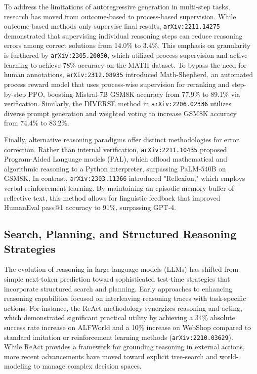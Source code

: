 \documentclass[11pt]{article}
\begin{document}
To address the limitations of autoregressive generation in multi-step tasks, research has moved from outcome-based to process-based supervision. While outcome-based methods only supervise final results, \texttt{arXiv:2211.14275} demonstrated that supervising individual reasoning steps can reduce reasoning errors among correct solutions from 14.0\% to 3.4\%. This emphasis on granularity is furthered by \texttt{arXiv:2305.20050}, which utilized process supervision and active learning to achieve 78\% accuracy on the MATH dataset. To bypass the need for human annotations, \texttt{arXiv:2312.08935} introduced Math-Shepherd, an automated process reward model that uses process-wise supervision for reranking and step-by-step PPO, boosting Mistral-7B GSM8K accuracy from 77.9\% to 89.1\% via verification. Similarly, the DIVERSE method in \texttt{arXiv:2206.02336} utilizes diverse prompt generation and weighted voting to increase GSM8K accuracy from 74.4\% to 83.2\%.

Finally, alternative reasoning paradigms offer distinct methodologies for error correction. Rather than internal verification, \texttt{arXiv:2211.10435} proposed Program-Aided Language models (PAL), which offload mathematical and algorithmic reasoning to a Python interpreter, surpassing PaLM-540B on GSM8K. In contrast, \texttt{arXiv:2303.11366} introduced "Reflexion," which employs verbal reinforcement learning. By maintaining an episodic memory buffer of reflective text, this method allows for linguistic feedback that improved HumanEval pass@1 accuracy to 91\%, surpassing GPT-4.

\subsection{Search, Planning, and Structured Reasoning Strategies}

The evolution of reasoning in large language models (LLMs) has shifted from simple next-token prediction toward sophisticated test-time strategies that incorporate structured search and planning. Early approaches to enhancing reasoning capabilities focused on interleaving reasoning traces with task-specific actions. For instance, the ReAct methodology synergizes reasoning and acting, which demonstrated significant practical utility by achieving a 34\% absolute success rate increase on ALFWorld and a 10\% increase on WebShop compared to standard imitation or reinforcement learning methods (\texttt{arXiv:2210.03629}). While ReAct provides a framework for grounding reasoning in external actions, more recent advancements have moved toward explicit tree-search and world-modeling to manage complex decision spaces.
\end{document}
